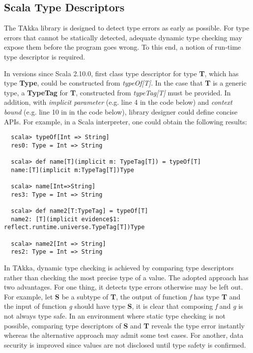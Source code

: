 \subsection{Scala Type Descriptors}
The TAkka library is designed to detect type errors as early as possible.  For
type errors that cannot be statically detected, adequate dynamic type checking
may expose them before the program goes wrong.  To this end, a notion of
run-time type descriptor is required.

In versions since Scala 2.10.0, first class type descriptor for type {\bf T},
which has type {\bf Type}, could be constructed from {\it typeOf[T]}.  In the
case that {\bf T} is a generic type, a {\bf TypeTag} for {\bf T}, constructed
from {\it typeTag[T]} must be provided.  In addition, with {\it implicit
parameter} (e.g. line 4 in the code below) and {\it context bound} (e.g. line 10
in in the code below), library designer could define concise APIs.  For example,
in a Scala interpreter, one could obtain the following results:

\begin{lstlisting}
  scala> typeOf[Int => String]
  res0: Type = Int => String

  scala> def name[T](implicit m: TypeTag[T]) = typeOf[T]
  name:[T](implicit m:TypeTag[T])Type

  scala> name[Int=>String]
  res3: Type = Int => String

  scala> def name2[T:TypeTag] = typeOf[T]
  name2: [T](implicit evidence$1: reflect.runtime.universe.TypeTag[T])Type

  scala> name2[Int => String]
  res2: Type = Int => String
\end{lstlisting}

In TAkka, dynamic type checking is achieved by comparing type descriptors rather
than checking the most precise type of a value.  The adopted approach has two
advantages.  For one thing, it detects type errors otherwise may be left out.
For example, let {\bf S} be a subtype of {\bf T}, the output of function {\it f}
has type {\bf T} and the input of function {\it g} should have type {\bf S}, it
is clear that composing {\it f} and {\it g} is not always type safe.  In an
environment where static type checking is not possible, comparing type
descriptors of {\bf S} and {\bf T} reveals the type error instantly whereas the
alternative approach may admit some test cases.  For another, data security is
improved since values are not disclosed until type safety is confirmed.

